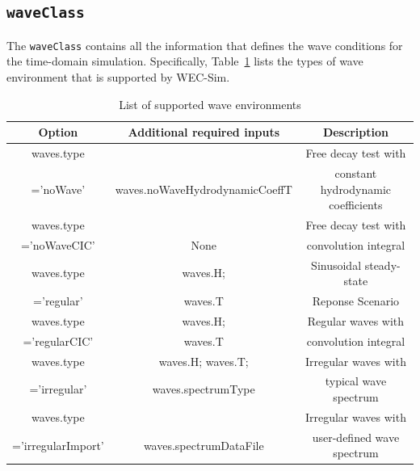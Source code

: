 \subsection{\texttt{waveClass}}\label{subsec:waveClass}
The \texttt{waveClass} contains all the information that defines the wave conditions for the time-domain simulation. Specifically, Table~\ref{Table: List of supported wave environments} lists the types of wave environment that is supported by WEC-Sim.

\begin{table}[H]
\noindent \centering{}\protect\caption{List of supported wave environments}
\begin{tabular}{|c|c|c|}
\hline 
 \textbf{Option} & \textbf{Additional required inputs}  & \textbf{Description} \tabularnewline
\hline 
waves.type&  &Free decay test with\\
='noWave'&waves.noWaveHydrodynamicCoeffT&constant hydrodynamic coefficients\tabularnewline
\hline 
waves.type& & Free decay test with\\
='noWaveCIC'&None&convolution integral\tabularnewline
\hline 
waves.type &waves.H; &Sinusoidal steady-state\\
='regular'&waves.T &Reponse Scenario\tabularnewline
\hline 
waves.type &waves.H; &Regular waves with\\
='regularCIC'&waves.T &convolution integral\tabularnewline
\hline 
waves.type&waves.H; waves.T; &Irregular waves with\\
='irregular'&waves.spectrumType&typical wave spectrum\tabularnewline
\hline 
waves.type&&Irregular waves with\\
='irregularImport'&waves.spectrumDataFile&user-defined wave spectrum\tabularnewline
\hline 
\end{tabular}
\label{Table: List of supported wave environments}
\end{table}
